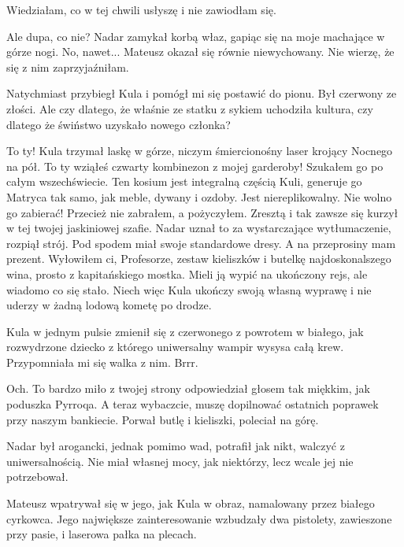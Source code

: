 Wiedziałam, co w tej chwili usłyszę i nie zawiodłam się.

\begin{dialogue}
\ds{} Ale dupa, co nie? \dm{} Nadar zamykał korbą właz, gapiąc się na moje machające w górze nogi.
\ds{} No, nawet... \dm{} Mateusz okazał się równie niewychowany. Nie wierzę, że się z nim zaprzyjaźniłam.
\end{dialogue}

Natychmiast przybiegł Kula i pomógł mi się postawić do pionu. Był czerwony ze złości.
Ale czy dlatego, że właśnie ze statku z sykiem uchodziła kultura, czy dlatego że świństwo uzyskało nowego członka?

\begin{dialogue}
\ds{} To ty! \dm{} Kula trzymał laskę w górze, niczym śmiercionośny laser krojący Nocnego na pół. \dm{} 
To ty wziąłeś czwarty kombinezon z mojej garderoby! 
Szukałem go po całym wszechświecie. Ten kosium jest integralną częścią Kuli, generuje go Matryca tak samo, jak meble, dywany i ozdoby.
Jest niereplikowalny. Nie wolno go zabierać!
\ds{} Przecież nie zabrałem, a pożyczyłem. Zresztą i tak zawsze się kurzył w tej twojej jaskiniowej szafie. \dm{}
Nadar uznał to za wystarczające wytłumaczenie, rozpiął strój. Pod spodem miał swoje standardowe dresy. \dm{} 
A na przeprosiny mam prezent. Wyłowiłem ci, Profesorze, zestaw kieliszków i butelkę najdoskonalszego wina, prosto z kapitańskiego mostka.
Mieli ją wypić na ukończony rejs, ale wiadomo co się stało. Niech więc Kula ukończy swoją własną wyprawę i nie uderzy w żadną lodową kometę po drodze. \de{}
\end{dialogue}

Kula w jednym pulsie zmienił się z czerwonego z powrotem w białego, jak rozwydrzone dziecko z którego uniwersalny wampir wysysa całą krew.
Przypomniała mi się walka z nim. Brrr.

\begin{dialogue}
\ds{} Och. To bardzo miło z twojej strony \dm{} odpowiedział głosem tak miękkim, jak poduszka Pyrroqa. \dm{} A teraz wybaczcie, muszę dopilnować ostatnich poprawek przy naszym bankiecie. \dm{}
Porwał butlę i kieliszki, poleciał na górę.
\end{dialogue}

Nadar był arogancki, jednak pomimo wad, potrafił jak nikt, walczyć z uniwersalnością.
Nie miał własnej mocy, jak niektórzy, lecz wcale jej nie potrzebował.

Mateusz wpatrywał się w jego, jak Kula w obraz, namalowany przez białego cyrkowca.
Jego największe zainteresowanie wzbudzały dwa pistolety, zawieszone przy pasie, i laserowa pałka na plecach.

